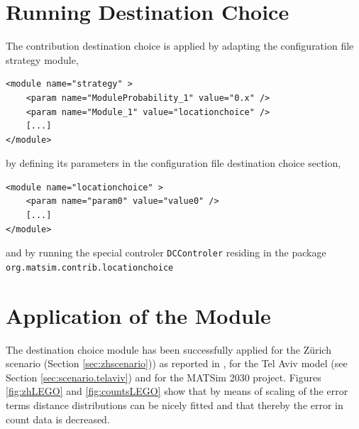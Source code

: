 \section{Running Destination Choice}
The contribution destination choice is applied by adapting the configuration file strategy module,
%
\begin{lstlisting}
<module name="strategy" > 
    <param name="ModuleProbability_1" value="0.x" /> 
    <param name="Module_1" value="locationchoice" /> 
    [...]
</module>
\end{lstlisting}
%
by defining its parameters in the configuration file destination choice section, 
%
\begin{lstlisting}
<module name="locationchoice" > 
    <param name="param0" value="value0" /> 
    [...]
</module>
\end{lstlisting}
%
and by running the special controler \lstinline|DCControler| residing in the package \lstinline|org.matsim.contrib.locationchoice|

\section{Application of the Module}
The destination choice module has been successfully applied for the Zürich scenario (Section \ref{sec:zhscenario})) as reported in \citet[][p.99]{Horni_PhDThesis_2013}, for the Tel Aviv model (see Section \ref{sec:scenario.telaviv}) and for the MATSim 2030 project. Figures \ref{fig:zhLEGO} and \ref{fig:countsLEGO} show that by means of scaling of the error terms distance distributions can be nicely fitted and that thereby the error in count data is decreased.

